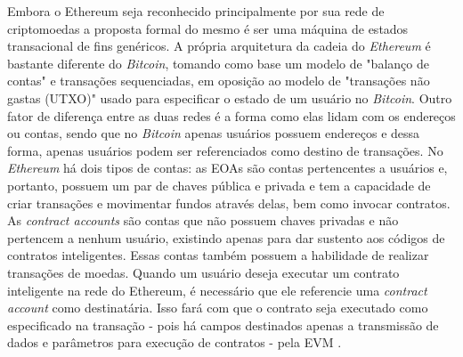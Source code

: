 %
Embora o Ethereum seja reconhecido principalmente por sua rede de criptomoedas a proposta formal do mesmo é ser uma máquina de estados transacional de fins genéricos. A própria arquitetura da cadeia do \textit{Ethereum} é bastante diferente do \textit{Bitcoin}, tomando como base um modelo de "balanço de contas" e transações sequenciadas, em oposição ao modelo de "transações não gastas (\ac{UTXO})" usado para especificar o estado de um usuário no \textit{Bitcoin}. Outro fator de diferença entre as duas redes é a forma como elas lidam com os endereços ou contas, sendo que no \textit{Bitcoin} apenas usuários possuem endereços e dessa forma, apenas usuários podem ser referenciados como destino de transações. No \textit{Ethereum} há dois tipos de contas: as \acp{EOA} são contas pertencentes a usuários e, portanto, possuem um par de chaves pública e privada e tem a capacidade de criar transações e movimentar fundos através delas, bem como invocar contratos. As \textit{contract accounts} são contas que não possuem chaves privadas e não pertencem a nenhum usuário, existindo apenas para dar sustento aos códigos de contratos inteligentes. Essas contas também possuem a habilidade de realizar transações de moedas. Quando um usuário deseja executar um contrato inteligente na rede do Ethereum, é necessário que ele referencie uma \textit{contract account} como destinatária. Isso fará com que o contrato seja executado como especificado na transação - pois há campos destinados apenas a transmissão de dados e parâmetros para execução de contratos - pela \ac{EVM} \cite{blockchain:mastering_ethereum}.

